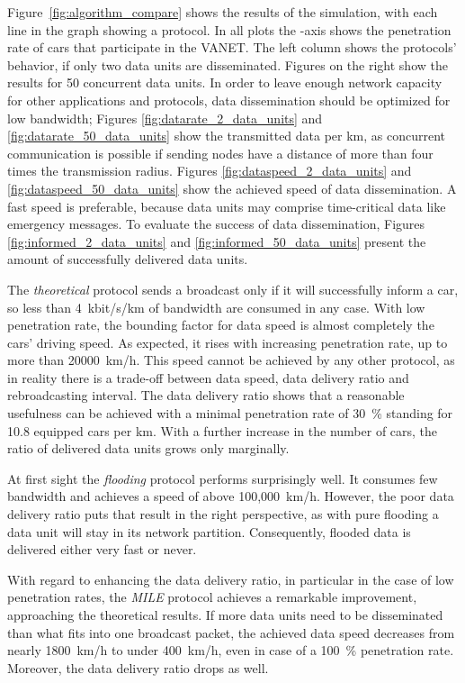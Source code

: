 \documentclass{acmrip}
\newcommand{\figref}[1]{Figure~\ref{fig:#1}}
\begin{document}
\figref{algorithm_compare} shows the results of the simulation, with
each line in the graph showing a protocol. In all plots the -axis
shows the penetration rate of cars that participate in the VANET.
The left column shows the protocols' behavior, if only two data
units are disseminated. Figures on the right show the results for 50
concurrent data units.
In order to leave enough network capacity for other applications and
protocols, data dissemination should be optimized for low bandwidth;
Figures \ref{fig:datarate_2_data_units} and
\ref{fig:datarate_50_data_units} show the transmitted data per km,
as concurrent communication is possible if sending nodes have a
distance of more than four times the transmission radius.
Figures \ref{fig:dataspeed_2_data_units} and
\ref{fig:dataspeed_50_data_units} show the achieved speed of data
dissemination. A fast speed is preferable, because data units may
comprise time-critical data like emergency messages.
To evaluate the success of data dissemination, Figures
\ref{fig:informed_2_data_units} and \ref{fig:informed_50_data_units}
present the amount of successfully delivered data units.


The \textit{theoretical} protocol sends a broadcast only if it will
successfully inform a car, so less than 4~kbit/s/km of bandwidth are
consumed in any case. With low penetration rate, the bounding factor
for data speed is almost completely the cars' driving speed. As
expected, it rises with increasing penetration rate, up to more than
20000~km/h. This speed cannot be achieved by any other protocol, as
in reality there is a trade-off between data speed, data delivery
ratio and rebroadcasting interval. The data delivery ratio shows
that a reasonable usefulness can be achieved with a minimal
penetration rate of 30~\% standing for 10.8 equipped cars per km.
With a further increase in the number of cars, the ratio of
delivered data units grows only marginally.


At first sight the \textit{flooding} protocol performs surprisingly
well. It consumes few bandwidth and achieves a speed of above
100,000~km/h. However, the poor data delivery ratio puts that result
in the right perspective, as with pure flooding a data unit will stay
in its network partition. Consequently, flooded data is delivered
either very fast or never.


With regard to enhancing the data delivery ratio, in particular in
the case of low penetration rates, the \textit{MILE} protocol
achieves a remarkable improvement, approaching the theoretical
results. If more data units need to be disseminated than what fits into
one broadcast packet, the achieved data speed decreases from nearly
1800~km/h to under 400~km/h, even in case of a 100~\% penetration
rate. Moreover, the data delivery ratio drops as well.
\end{document}
